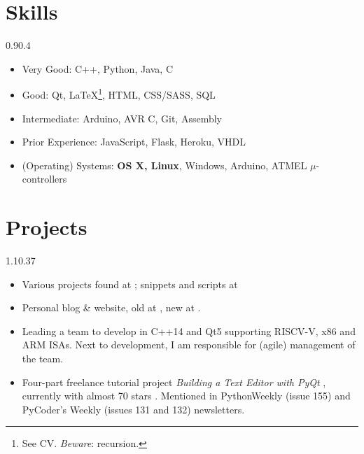 \section{Skills}{0.9}{0.4}
\vspace{-2mm}
\begin{multicols}{2}
	\begin{itemize}
		\item Very Good: C++, Python, Java, C
		\item Good: Qt, \LaTeX\footnote{See CV. \emph{Beware}: recursion.}, HTML,
      CSS/SASS, SQL
		\item Intermediate: Arduino, AVR C, Git, Assembly
		\item Prior Experience: JavaScript, Flask, Heroku, VHDL
		\item (Operating) Systems: \textbf{OS X, Linux}, Windows, Arduino, ATMEL $\mu$-controllers
	\end{itemize}
\end{multicols}

\section{Projects}{1.1}{0.37}
\vspace{-5mm}
\begin{itemize}
	\item Various projects found at
	; snippets and scripts at 
	\item Personal blog \& website, old at , new at .
  \item Leading a team to develop  in C++14 and Qt5 supporting RISCV-V, x86 and ARM ISAs. Next to development, I am responsible for (agile) management of the team.
	\item Four-part freelance tutorial project \emph{Building a Text Editor with
      PyQt} , currently with
    almost 70 stars . Mentioned in PythonWeekly (issue 155) and PyCoder's Weekly (issues 131 and 132) newsletters.
\end{itemize}

